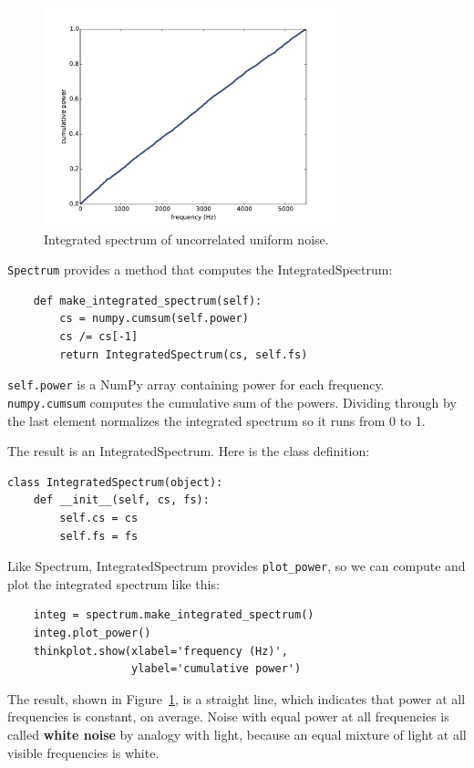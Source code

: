 \documentclass[12pt]{book}
\begin{document}
\begin{figure}
\centerline{\includegraphics[height=2.5in]{figs/whitenoise2.pdf}}
\caption{Integrated spectrum of uncorrelated uniform noise.}
\label{fig.whitenoise2}
\end{figure}

{\tt Spectrum} provides a method that computes the IntegratedSpectrum:

\begin{verbatim}
    def make_integrated_spectrum(self):
        cs = numpy.cumsum(self.power)
        cs /= cs[-1]
        return IntegratedSpectrum(cs, self.fs)
\end{verbatim}

{\tt self.power} is a NumPy array containing power for each frequency.
{\tt numpy.cumsum} computes the cumulative sum of the powers.
Dividing through by the last element normalizes the integrated
spectrum so it runs from 0 to 1.

The result is an IntegratedSpectrum.  Here is the class definition:

\begin{verbatim}
class IntegratedSpectrum(object):    
    def __init__(self, cs, fs):
        self.cs = cs
        self.fs = fs
\end{verbatim}

Like Spectrum, IntegratedSpectrum provides \verb"plot_power", so
we can compute and plot the integrated spectrum like this:

\begin{verbatim}
    integ = spectrum.make_integrated_spectrum()
    integ.plot_power()
    thinkplot.show(xlabel='frequency (Hz)',
                   ylabel='cumulative power')
\end{verbatim}

The result, shown in Figure~\ref{fig.whitenoise2}, is a straight line,
which indicates that power at all frequencies is constant, on average.
Noise with equal power at all frequencies is called {\bf white noise}
by analogy with light, because an equal mixture of light at all
visible frequencies is white.
\end{document}
